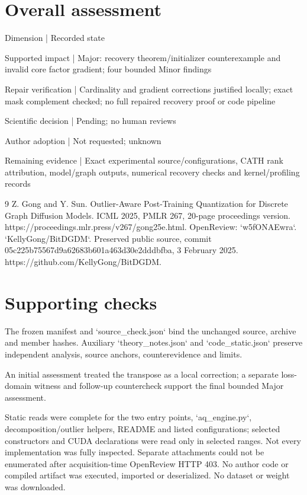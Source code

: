 \documentclass[10pt]{article}
\begin{document}
\section*{Overall assessment}
Dimension | Recorded state\par
Supported impact | Major: recovery theorem/initializer counterexample and invalid core factor gradient; four bounded Minor findings\par
Repair verification | Cardinality and gradient corrections justified locally; exact mask complement checked; no full repaired recovery proof or code pipeline\par
Scientific decision | Pending; no human reviews\par
Author adoption | Not requested; unknown\par
Remaining evidence | Exact experimental source/configurations, CATH rank attribution, model/graph outputs, numerical recovery checks and kernel/profiling records\par
9 Z. Gong and Y. Sun. Outlier-Aware Post-Training Quantization for Discrete Graph Diffusion Models. ICML 2025, PMLR 267, 20-page proceedings version. https://proceedings.mlr.press/v267/gong25e.html. OpenReview: `w5fONAEwra`. `KellyGong/BitDGDM`. Preserved public source, commit 05c225b75567d9a62683b601a463d30e2dddbfba, 3 February 2025. https://github.com/KellyGong/BitDGDM.\par
\section*{Supporting checks}
The frozen manifest and `source\_check.json` bind the unchanged source, archive and member hashes. Auxiliary `theory\_notes.json` and `code\_static.json` preserve independent analysis, source anchors, counterevidence and limits.\par
An initial assessment treated the transpose as a local correction; a separate loss-domain witness and follow-up countercheck support the final bounded Major assessment.\par
Static reads were complete for the two entry points, `aq\_engine.py`, decomposition/outlier helpers, README and listed configurations; selected constructors and CUDA declarations were read only in selected ranges. Not every implementation was fully inspected. Separate attachments could not be enumerated after acquisition-time OpenReview HTTP 403. No author code or compiled artifact was executed, imported or deserialized. No dataset or weight was downloaded.\par
\end{document}
